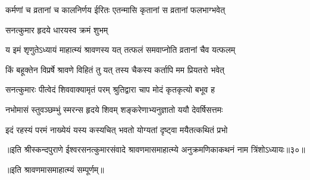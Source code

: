 \twolineshloka
{कर्मणां च व्रतानां च कालनिर्णय ईरितः}
{एतन्मासि कृतानां स व्रतानां फलभाग्भवेत्} %

\onelineshloka
{सनत्कुमार हृदये धारयस्व क्रमं शुभम्} %

\twolineshloka
{य इमं शृणुतेऽध्यायं माहात्म्यं श्रावणस्य यत्}
{तत्फलं समवाप्नोति व्रतानां चैव यत्फलम्} %

\twolineshloka
{किं बहूक्तेन विप्रर्षे श्रावणे विहितं तु यत्}
{तस्य चैकस्य कर्तापि मम प्रियतरो भवेत्} %


\twolineshloka
{सनत्कुमारः पीत्वेदं शिववाक्यामृतं परम्}
{श्रुतिद्वारा चाप मोदं कृतकृत्यो बभूव ह} %

\twolineshloka
{नभोमासं स्तुवञ्छम्भुं स्मरन्स हृदये शिवम्}
{शङ्करेणाभ्यनुज्ञातो ययौ देवर्षिसत्तमः} %

\twolineshloka
{इदं रहस्यं परमं नाख्येयं यस्य कस्यचित्}
{भवतो योग्यतां दृष्ट्वा मयैतत्कथितं प्रभो} %


{॥इति श्रीस्कन्दपुराणे ईश्वरसनत्कुमारसंवादे श्रावणमासमाहात्म्ये अनुक्रमणिकाकथनं नाम त्रिंशोऽध्यायः॥३०॥}

{॥इति श्रावणमासमाहात्म्यं सम्पूर्णम्॥}

